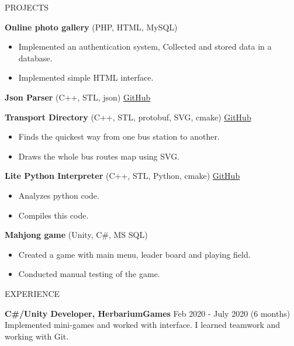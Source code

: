 \documentclass{resume} %
\begin{document}
\begin{rSection}{PROJECTS}
\vspace{-1.25em}
\item \textbf{Online photo gallery} {(PHP, HTML, MySQL)} \hfill
\begin{itemize}
    \itemsep -3pt {} 
     \item Implemented an authentication system, Collected and stored data in a database.
     \item Implemented simple HTML interface.
 \end{itemize}
 
\item \textbf{Json Parser} {(C++, STL, json)} \hfill
\href{https://github.com/Bfalse123/jsonparser}{GitHub}
 
\item \textbf{Transport Directory} {(C++, STL, protobuf, SVG, cmake)} \hfill \href{https://github.com/Bfalse123/TransportDirectory}{GitHub}
\begin{itemize}
    \itemsep -3pt {} 
     \item Finds the quickest way from one bus station to another.
     \item Draws the whole bus routes map using SVG.
 \end{itemize}

 \item \textbf{Lite Python Interpreter} {(C++, STL, Python, cmake)} \hfill \href{https://github.com/Bfalse123/LitePythonInterpreter/}{GitHub}
\begin{itemize}
    \itemsep -3pt {} 
     \item Analyzes python code.
     \item Compiles this code.
 \end{itemize}
 
 \item \textbf{Mahjong game} {(Unity, C\#, MS SQL)} \hfill
\begin{itemize}
    \itemsep -3pt {} 
     \item Created a game with main menu, leader board and playing field.
     \item Conducted manual testing of the game.
 \end{itemize}
\end{rSection} 
 
 
\begin{rSection}{EXPERIENCE}
 
\textbf{C\#/Unity Developer, HerbariumGames} \hfill Feb 2020 - July 2020 (6 months)\\
Implemented mini-games and worked with interface. I learned teamwork and working with Git.
 
\end{rSection} 
 
\end{document}
